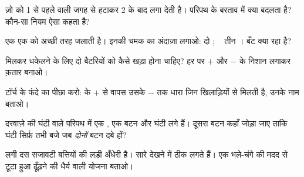\begin{exercise}[$\star$]\label{exo:g4:series-circuits:4}
ज़ो  को  1 से पहले वाली जगह से हटाकर  2 के बाद लगा देती
है। परिपथ के बरताव में क्या बदलता है? कौन-सा नियम ऐसा कहता है?
\end{exercise}

\begin{exercise}[$\star$]\label{exo:g4:series-circuits:5}
एक  एक  को अच्छी तरह जलाती है। इनकी चमक का अंदाज़ा लगाओ:
 दो ; \  तीन । बँट क्या रहा है?
\end{exercise}

\begin{exercise}[$\star$]\label{exo:g4:series-circuits:6}
मिलकर धकेलने के लिए दो बैटरियों को कैसे खड़ा होना चाहिए? हर  पर
$+$ और $-$ के निशान लगाकर क़तार बनाओ।
\end{exercise}

\begin{exercise}[$\star$]\label{exo:g4:series-circuits:7}
टॉर्च के फंदे का पीछा करो:  के $+$ से वापस उसके $-$ तक धारा जिन
खिलाड़ियों से मिलती है, उनके नाम बताओ।
\end{exercise}

\begin{exercise}[$\star$]\label{exo:g4:series-circuits:8}
दरवाज़े की घंटी वाले परिपथ में एक , एक बटन और घंटी 
लगे हैं। दूसरा बटन कहाँ जोड़ा जाए ताकि घंटी सिर्फ़ तभी बजे जब
\emph{दोनों} बटन दबे हों?
\end{exercise}

\begin{exercise}[$\star$]\label{exo:g4:series-circuits:9}
 लगी दस सजावटी बत्तियों की लड़ी अँधेरी है। सारे  देखने
में ठीक लगते हैं। एक भले-चंगे  की मदद से टूटा हुआ  ढूँढ़ने की
धैर्य वाली योजना बताओ।
\end{exercise}

